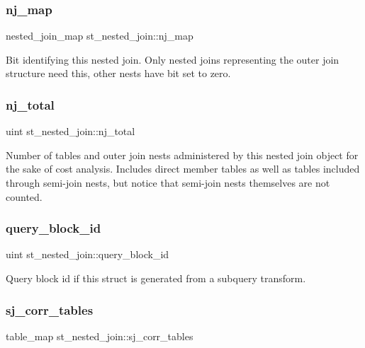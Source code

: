 \subsubsection{\texorpdfstring{nj\+\_\+map}{nj\_map}}
{\footnotesize\ttfamily nested\+\_\+join\+\_\+map st\+\_\+nested\+\_\+join\+::nj\+\_\+map}

Bit identifying this nested join. Only nested joins representing the outer join structure need this, other nests have bit set to zero. \mbox{\label{structst__nested__join_a9c35fa9ceadc335b3a9c06e498d4f8e5}} 
\subsubsection{\texorpdfstring{nj\+\_\+total}{nj\_total}}
{\footnotesize\ttfamily uint st\+\_\+nested\+\_\+join\+::nj\+\_\+total}

Number of tables and outer join nests administered by this nested join object for the sake of cost analysis. Includes direct member tables as well as tables included through semi-\/join nests, but notice that semi-\/join nests themselves are not counted. \mbox{\label{structst__nested__join_ae77e1736a81f0c6de9df6d9953106f12}} 
\subsubsection{\texorpdfstring{query\+\_\+block\+\_\+id}{query\_block\_id}}
{\footnotesize\ttfamily uint st\+\_\+nested\+\_\+join\+::query\+\_\+block\+\_\+id}

Query block id if this struct is generated from a subquery transform. \mbox{\label{structst__nested__join_ab4542c325c02396712de1f629fd621a9}} 
\subsubsection{\texorpdfstring{sj\+\_\+corr\+\_\+tables}{sj\_corr\_tables}}
{\footnotesize\ttfamily table\+\_\+map st\+\_\+nested\+\_\+join\+::sj\+\_\+corr\+\_\+tables}

